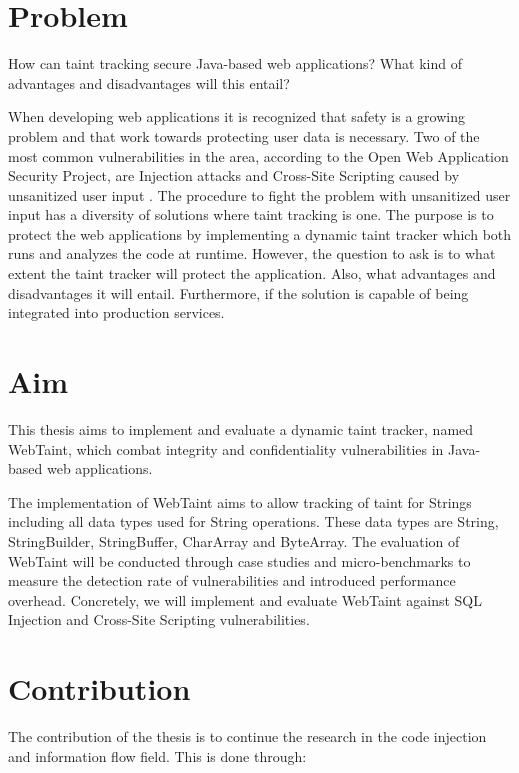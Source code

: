 \section{Problem}
\label{Problem}
\begin{chapquote}{}
    How can taint tracking secure Java-based web applications? What kind of advantages and disadvantages will this entail?
\end{chapquote}

\noindent
When developing web applications it is recognized that safety is a growing problem and that work towards protecting user data is necessary. Two of the most common vulnerabilities in the area, according to the Open Web Application Security Project, are Injection attacks and Cross-Site Scripting caused by unsanitized user input \parencite{OWASP2017}. The procedure to fight the problem with unsanitized user input has a diversity of solutions where taint tracking is one. The purpose is to protect the web applications by implementing a dynamic taint tracker which both runs and analyzes the code at runtime. However, the question to ask is to what extent the taint tracker will protect the application. Also, what advantages and disadvantages it will entail. Furthermore, if the solution is capable of being integrated into production services.



\section{Aim}
\label{Aim}
This thesis aims to implement and evaluate a dynamic taint tracker, named WebTaint, which combat integrity and confidentiality vulnerabilities in Java-based web applications. 

The implementation of WebTaint aims to allow tracking of taint for Strings including all data types used for String operations. These data types are String, StringBuilder, StringBuffer, CharArray and ByteArray. The evaluation of WebTaint will be conducted through case studies and micro-benchmarks to measure the detection rate of vulnerabilities and introduced performance overhead. Concretely, we will implement and evaluate WebTaint against SQL Injection and Cross-Site Scripting vulnerabilities.



\section{Contribution}
\label{Contribution}
The contribution of the thesis is to continue the research in the code injection and information flow field. This is done through:

